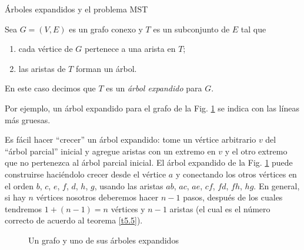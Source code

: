 \begin{section}{Árboles expandidos y el problema MST} \label{6.2}

\begin{definicion}
    Sea  $G=(V,E)$ es un grafo conexo y  $T$ es un subconjunto de $E$ tal que
    \begin{enumerate}[label=\textit{\alph*)}]
        \item  cada vértice de $G$ pertenece a una arista en $T$;
        \item  las aristas de $T$ forman un árbol.
    \end{enumerate}
    En este caso decimos que $T$ es un \textit{árbol expandido} para  $G$.  
\end{definicion}
   Por ejemplo, un árbol expandido para el grafo de la Fig. \ref{f6.3} se indica con las líneas más gruesas.

Es fácil hacer ``crecer'' un árbol expandido: tome un vértice arbitrario $v$ del ``árbol parcial'' inicial y agregue aristas con un extremo en $v$ y el otro extremo que no pertenezca al árbol parcial inicial. El árbol expandido de la Fig. \ref{f6.3} puede construirse haciéndolo crecer desde el vértice $a$ y conectando los otros vértices en el orden $b$, $c$, $e$, $f$, $d$, $h$, $g$, usando las aristas $ab$, $ac$, $ae$, $cf$,  $fd$, $fh$, $hg$. En general, si hay $n$ vértices nosotros deberemos hacer $n-1$ pasos, después de los cuales tendremos $1+(n-1)=n$ vértices y $n-1$ aristas (el cual es el número correcto de acuerdo al teorema \ref{t5.5}).

\begin{figure}[ht]
    \begin{center}
    \end{center}
    \caption{Un grafo y uno de sus árboles expandidos} \label{f6.3}
\end{figure}



\end{section}
